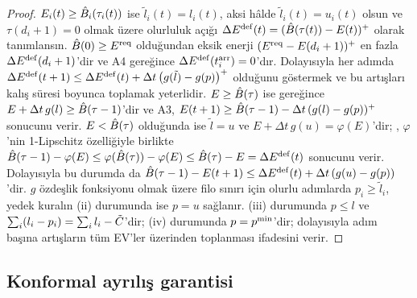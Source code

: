 \begin{proof}
$E_i(t)\ge\hat B_i(\tau_i(t))$ ise $\tilde l_i(t)=l_i(t)$, aksi hâlde $\tilde l_i(t)=u_i(t)$ olsun ve $\tau(d_i+1)=0$ olmak üzere olurluluk açığı $\Delta E^{\mathrm{def}}(t)=(\hat B(\tau(t))-E(t))^{+}$ olarak tanımlansın.
$\hat B(0)\ge E^{\mathrm{req}}$ olduğundan eksik enerji $(E^{\mathrm{req}}-E(d_i+1))^{+}$ en fazla $\Delta E^{\mathrm{def}}(d_i+1)$'dir ve A4 gereğince $\Delta E^{\mathrm{def}}(t_i^{\mathrm{arr}})=0$'dır.
Dolayısıyla her adımda $\Delta E^{\mathrm{def}}(t+1)\le\Delta E^{\mathrm{def}}(t)+\Delta t\,\big(g(\tilde l)-g(p)\big)^{+}$ olduğunu göstermek ve bu artışları kalış süresi boyunca toplamak yeterlidir.
$E\ge\hat B(\tau)$ ise  gereğince $E+\Delta t\,g(l)\ge\hat B(\tau-1)$'dir ve A3, $E(t+1)\ge\hat B(\tau-1)-\Delta t\,(g(l)-g(p))^{+}$ sonucunu verir.
$E<\hat B(\tau)$ olduğunda ise $\tilde l=u$ ve $E+\Delta t\,g(u)=\varphi(E)$'dir; , $\varphi$'nin 1-Lipschitz özelliğiyle birlikte $\hat B(\tau-1)-\varphi(E)\le\varphi(\hat B(\tau))-\varphi(E)\le\hat B(\tau)-E=\Delta E^{\mathrm{def}}(t)$ sonucunu verir.
Dolayısıyla bu durumda da $\hat B(\tau-1)-E(t+1)\le\Delta E^{\mathrm{def}}(t)+\Delta t\,(g(u)-g(p))$'dir.
$g$ özdeşlik fonksiyonu olmak üzere filo sınırı için olurlu adımlarda $p_i\ge\tilde l_i$, yedek kuralın (ii) durumunda ise $p=u$ sağlanır.
(iii) durumunda $p\le l$ ve $\sum_i(l_i-p_i)=\sum_il_i-\tilde C$'dir; (iv) durumunda $p=p^{\min}$'dir; dolayısıyla adım başına artışların tüm EV'ler üzerinden toplanması  ifadesini verir.
\end{proof}

\subsection{Konformal ayrılış garantisi}\label{app:conformal}

